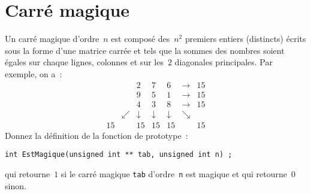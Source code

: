 \section{Carr\'e magique}
Un carr\'e magique d'ordre~$n$ est compos\'e des~$n^{2}$ premiers entiers (distincts) \'ecrits sous la forme d'une matrice carr\'ee et tels que la sommes des nombres soient \'egales sur chaque lignes, colonnes et sur les~$2$ diagonales principales.
Par exemple, on a~:
\[
\begin{array}{cccccccc}
&&  2 & 7 & 6 &\rightarrow & 15 \\
& & 9 & 5 & 1 &\rightarrow & 15 \\
& & 4 & 3 & 8 &\rightarrow & 15 \\
& \swarrow& \downarrow &  \downarrow &  \downarrow & \searrow \\
 15 & & 15 & 15 & 15 &  &15 
\end{array}
\]
Donnez la d\'efinition de la fonction de prototype~:
\begin{verbatim}
int EstMagique(unsigned int ** tab, unsigned int n) ;
\end{verbatim}
qui retourne~$1$ si le carr\'e magique \verb+tab+ d'ordre~\verb+n+ est
magique et qui retourne~$0$ sinon.
\ifcorrection
\begin{correction}
  
\end{correction}
\fi


